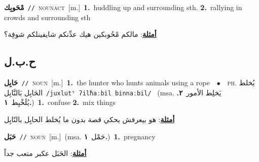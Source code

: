 \documentclass[10pt,a4paper,twoside]{article} %
\begin{document}
\begin{multicols}{2}
{\setlength\topsep{0pt}\textbf{\foreignlanguage{arabic}{مْحَوبِك}}\ {\color{gray}\texttt{//}\color{black}}\ \textsc{noun\textunderscore act}\ [m.]\ \textbf{1.}~huddling up and surrounding sth.  \textbf{2.}~rallying in crowds and surrounding sth\  \begin{flushright}\color{gray}\foreignlanguage{arabic}{\textbf{\underline{\foreignlanguage{arabic}{أمثلة}}}: مالكم مْحُوبكين هيك عدِّنكم شايفينلكم شوفِة؟}\end{flushright}\color{black}} \vspace{2mm}

\vspace{-3mm}
\subsection*{\color{blue}\foreignlanguage{arabic}{ح.ب.ل}\color{blue}{}} 

{\setlength\topsep{0pt}\textbf{\foreignlanguage{arabic}{حَابِل}}\ {\color{gray}\texttt{//}\color{black}}\ \textsc{noun}\ [m.]\ \textbf{1.}~the hunter who hunts animals using a rope\ \ $\bullet$\ \ \textsc{ph.} \color{gray} \foreignlanguage{arabic}{يُخلط الحَابِل بَالنَّابِل}\color{black}\ {\color{gray}\texttt{/{\sffamily juxlutˤ ʔilħaːbil binnaːbil}/}\color{black}}\ \color{gray} (msa. \foreignlanguage{arabic}{يَخلِط الأمور}~\foreignlanguage{arabic}{\textbf{٢.}}  \foreignlanguage{arabic}{يُلَخْبِط}~\foreignlanguage{arabic}{\textbf{١.}})\color{black}\ \textbf{1.}~confuse  \textbf{2.}~mix things\  \begin{flushright}\color{gray}\foreignlanguage{arabic}{\textbf{\underline{\foreignlanguage{arabic}{أمثلة}}}: هو بيعرفش يحكي قصة بدون ما يُخلط الحابِل بالنّابِل}\end{flushright}\color{black}} \vspace{2mm}

{\setlength\topsep{0pt}\textbf{\foreignlanguage{arabic}{حَبَل}}\ {\color{gray}\texttt{//}\color{black}}\ \textsc{noun}\ [m.]\ \color{gray}(msa. \foreignlanguage{arabic}{حَمْل}~\foreignlanguage{arabic}{\textbf{١.}})\color{black}\ \textbf{1.}~pregnancy\  \begin{flushright}\color{gray}\foreignlanguage{arabic}{\textbf{\underline{\foreignlanguage{arabic}{أمثلة}}}: الحَبَل عكبر متعب جداً}\end{flushright}\color{black}} \vspace{2mm}


\end{multicols}
\end{document}
